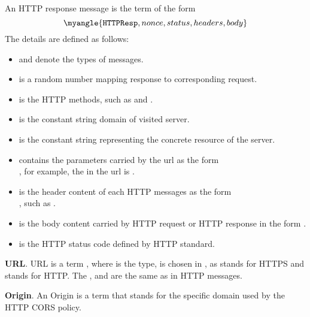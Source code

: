 An HTTP response message is the term of the form
\begin{equation*}
\setlength{\abovedisplayskip}{1pt}
\setlength{\belowdisplayskip}{1pt}
    \myangle{\mathtt{HTTPResp}, nonce, status, headers, body}
\end{equation*}
 The details are defined as follows:
 \vspace{-3mm}
 \begin{itemize}
 \item {} and  denote the types of messages.
 \item {} is a random number mapping response to corresponding request.
 \item {} is the HTTP methods, such as  and .
 \item {} is the constant string domain of visited server.
 \item {} is the constant string representing the concrete resource of the server.
 \item {} contains the parameters carried by the url as the form \\ , for example, the  in the url   is .
 \item {} is the header content of each HTTP messages as the form \\ , such as  .
 \item {} is the body content carried by HTTP  request or HTTP response in the form .
  \item {} is the HTTP status code defined by HTTP standard.
 \end{itemize}
\vspace{-2mm}
\noindent\textbf{URL}.
URL is a term , where  is the type,  is chosen in ,  as  stands for HTTPS and  stands for HTTP. The , and  are the same as in HTTP messages.

\vspace{1mm}\noindent\textbf{Origin}.
An Origin is a term  that stands for the specific domain used by the HTTP CORS policy.

